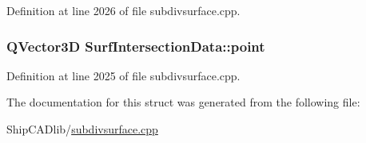 Definition at line 2026 of file subdivsurface.\-cpp.

\hypertarget{structSurfIntersectionData_a789d1758e7035fdf5b902861e936113a}{
\subsubsection[{point}]{\setlength{\rightskip}{0pt plus 5cm}Q\-Vector3\-D Surf\-Intersection\-Data\-::point}}\label{structSurfIntersectionData_a789d1758e7035fdf5b902861e936113a}


Definition at line 2025 of file subdivsurface.\-cpp.



The documentation for this struct was generated from the following file\-:\begin{DoxyCompactItemize}
\item 
Ship\-C\-A\-Dlib/\hyperlink{subdivsurface_8cpp}{subdivsurface.\-cpp}\end{DoxyCompactItemize}
